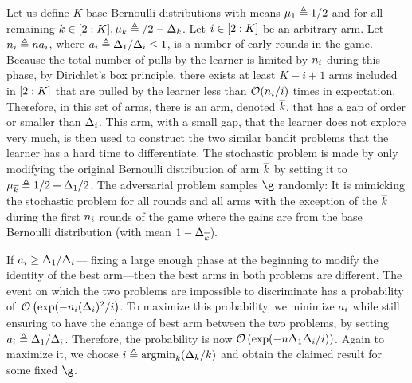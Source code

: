 Let us define $K$ base Bernoulli distributions with  
means $\mu_1 \triangleq 1/2$ and for all remaining $k\in[2:K], \mu_k\triangleq/2-\Delta_k$. 
Let $i\in[2:K]$ be  an arbitrary arm.
Let $n_i\triangleq na_i$, where $a_i \triangleq \Delta_1/\Delta_i\leq 1$, is a number of early rounds in the game.
Because the total number of pulls by the learner is 
limited by $n_i$ 
during this phase, by Dirichlet's box principle,  there exists at least $K-i+1$  arms included in $[2:K]$ %
that are pulled  by the learner less than $\mathcal{O}(n_i/i)$ times in 
expectation. 
Therefore, in this set of arms,  there is an arm, 
 denoted $\overline k$, that 
 has a gap of order or smaller than $\Delta_{i}$.
 This arm, with a small gap, that the learner does 
 not explore very much, is then used 
 to  construct the two similar bandit problems 
 that the learner has a hard time to differentiate.
%
The stochastic problem is made by only modifying the
original Bernoulli distribution of arm $\overline k$  
by setting it  to 
$\mu_{\overline k} \triangleq 1/2 + \Delta_1/2$. 
The adversarial problem samples  $\gainVector$ randomly: 
 It is mimicking the stochastic 
problem  for all rounds and all arms with the exception 
of the $\overline k$ during the first  $n_i$ 
rounds of the game where the gains are from 
the base Bernoulli distribution (with mean $1-\Delta_{\overline k}$).




If  $a_i\geq \Delta_1/\Delta_i$--- 
fixing a large enough phase at the beginning to 
modify the identity of the best arm---then  the best 
arms in both problems are different. The event on which the 
two problems are impossible to discriminate has a probability of~$\mathcal{O}\left(\exp(-n_i(\Delta_i)^2/i\right)$. %
To maximize this probability, we minimize $a_i$ 
while still ensuring  to  have the change of best arm 
between the two problems, by setting $a_i  \triangleq\Delta_1/\Delta_i$.
Therefore, the probability is now   
$\mathcal{O}\left(\exp(-n\Delta_{1}\Delta_i/i)\right)$.
Again to maximize  it, we choose 
$i \triangleq \mathrm{argmin}_k (\Delta_k/k)$ and obtain the claimed result for some fixed $\gainVector$.
%